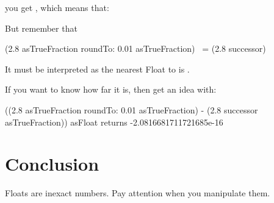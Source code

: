 \documentclass[a4paper,10pt,twoside]{book}
\begin{document}
you get , which means that:

But remember that 

\begin{code}{}
(2.8 asTrueFraction roundTo: 0.01 asTrueFraction) ~= (2.8 successor)
\end{code}

It must be interpreted as the nearest Float to  is .

If you want to know how far it is, then get an idea with:

\begin{code}{}
((2.8 asTrueFraction roundTo: 0.01 asTrueFraction) - (2.8 successor asTrueFraction)) asFloat
	returns -2.0816681711721685e-16
\end{code}



\section{Conclusion}
Floats are inexact numbers. Pay attention when you manipulate them.


\ifx\wholebook\relax\else
   
   
\end{document}
